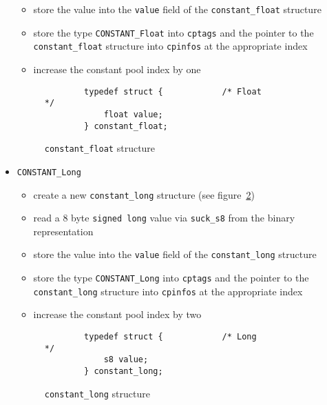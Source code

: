 \begin{itemize}
\begin{itemize}
  \item store the value into the \texttt{value} field of the
  \texttt{constant\_float} structure

  \item store the type \texttt{CONSTANT\_Float} into \texttt{cptags}
  and the pointer to the \texttt{constant\_float} structure into
  \texttt{cpinfos} at the appropriate index

  \item increase the constant pool index by one

 \end{itemize}

\begin{figure}[h]
\begin{verbatim}
        typedef struct {            /* Float                                      */
            float value;
        } constant_float;
\end{verbatim}
\caption{\texttt{constant\_float} structure}
\label{constantfloatstructure}
\end{figure}

 \item \texttt{CONSTANT\_Long}

 \begin{itemize}

  \item create a new \texttt{constant\_long} structure (see
  figure~\ref{constantlongstructure})

  \item read a 8 byte \texttt{signed long} value via \texttt{suck\_s8}
  from the binary representation

  \item store the value into the \texttt{value} field of the
  \texttt{constant\_long} structure

  \item store the type \texttt{CONSTANT\_Long} into \texttt{cptags}
  and the pointer to the \texttt{constant\_long} structure into
  \texttt{cpinfos} at the appropriate index

  \item increase the constant pool index by two

 \end{itemize}

\begin{figure}[h]
\begin{verbatim}
        typedef struct {            /* Long                                       */
            s8 value;
        } constant_long;
\end{verbatim}
\caption{\texttt{constant\_long} structure}
\label{constantlongstructure}
\end{figure}


\end{itemize}
